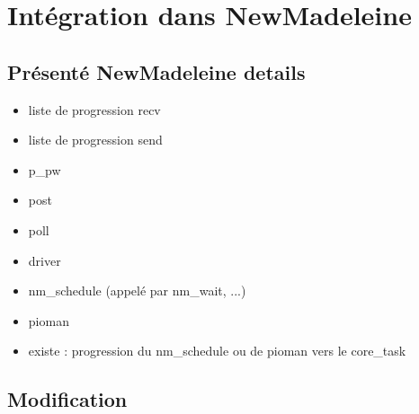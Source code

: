 \section{Intégration dans NewMadeleine}

\subsection{Présenté NewMadeleine details}

\begin{itemize}
  \item liste de progression recv
  \item liste de progression send
  \item p_pw
  \item post
  \item poll
  \item driver
  \item nm_schedule (appelé par nm_wait, ...)
  \item pioman
  \item existe : progression du nm_schedule ou de pioman vers le core_task
\end{itemize}

\subsection{Modification}

